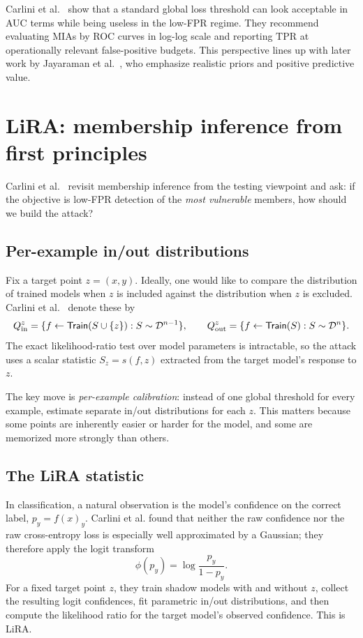 \documentclass[11pt]{article}
\theoremstyle{definition}
\newcommand{\1}{\mathbf{1}}
\newcommand{\Train}{\mathsf{Train}}
\newcommand{\TPR}{\mathrm{TPR}}
\begin{document}
Carlini et al.~\cite{carlini2022} show that a standard global loss threshold can look acceptable in AUC terms while being useless in the low-FPR regime. They recommend evaluating MIAs by ROC curves in log-log scale and reporting $\TPR$ at operationally relevant false-positive budgets. This perspective lines up with later work by Jayaraman et al.~\cite{jayaraman2021}, who emphasize realistic priors and positive predictive value.

\section{LiRA: membership inference from first principles}

Carlini et al.~\cite{carlini2022} revisit membership inference from the testing viewpoint and ask: if the objective is low-FPR detection of the \emph{most vulnerable} members, how should we build the attack?

\subsection{Per-example in/out distributions}

Fix a target point $z=(x,y)$. Ideally, one would like to compare the distribution of trained models when $z$ is included against the distribution when $z$ is excluded. Carlini et al.~\cite{carlini2022} denote these by
\[
Q_{\mathrm{in}}^z = \{ f \leftarrow \Train(S \cup \{z\}) : S \sim \cD^{n-1} \},
\qquad
Q_{\mathrm{out}}^z = \{ f \leftarrow \Train(S) : S \sim \cD^n \}.
\]
The exact likelihood-ratio test over model parameters is intractable, so the attack uses a scalar statistic $S_z = s(f,z)$ extracted from the target model's response to $z$.

The key move is \emph{per-example calibration}: instead of one global threshold for every example, estimate separate in/out distributions for each $z$. This matters because some points are inherently easier or harder for the model, and some are memorized more strongly than others.

\subsection{The LiRA statistic}

In classification, a natural observation is the model's confidence on the correct label, $p_y = f(x)_y$. Carlini et al. found that neither the raw confidence nor the raw cross-entropy loss is especially well approximated by a Gaussian; they therefore apply the logit transform
\[
\phi(p_y) = \log\frac{p_y}{1-p_y}.
\]
For a fixed target point $z$, they train shadow models with and without $z$, collect the resulting logit confidences, fit parametric in/out distributions, and then compute the likelihood ratio for the target model's observed confidence. This is LiRA.
\end{document}
